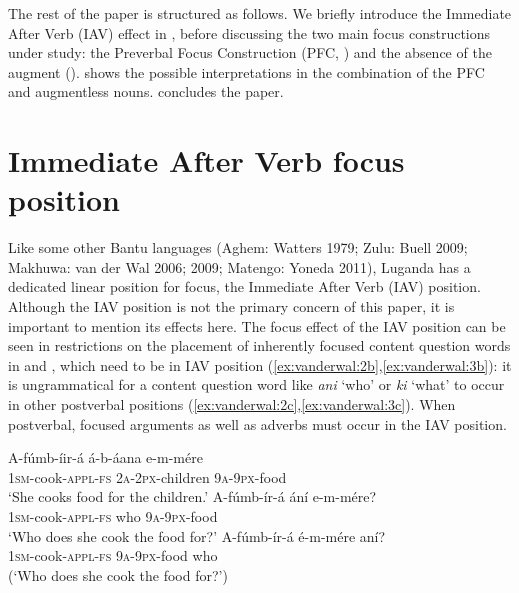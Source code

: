 \documentclass[output=paper]{langsci/langscibook}
\begin{document}
The rest of the paper is structured as follows. We briefly introduce the Immediate After Verb (IAV) effect in , before discussing the two main focus constructions under study: the Preverbal Focus Construction (PFC, ) and the absence of the augment ().  shows the possible interpretations in the combination of the PFC and augmentless nouns.  concludes the paper.

 \section{Immediate After Verb focus position}\label{sec:vanderwal:2}

Like some other Bantu languages (Aghem: Watters 1979; Zulu: Buell 2009; Makhuwa: van der Wal 2006; 2009; Matengo: Yoneda 2011), Luganda has a dedicated linear position for focus, the Immediate After Verb (IAV) position. Although the IAV position is not the primary concern of this paper, it is important to mention its effects here. The focus effect of the IAV position can be seen in restrictions on the placement of inherently focused content question words in  and , which need to be in IAV position (\ref{ex:vanderwal:2b},\ref{ex:vanderwal:3b}): it is ungrammatical for a content question word like \textit{ani} ‘who’ or \textit{ki} ‘what’ to occur in other postverbal positions (\ref{ex:vanderwal:2c},\ref{ex:vanderwal:3c}). When postverbal, focused arguments as well as adverbs must occur in the IAV position.

\ea\label{ex:vanderwal:2}
\ea\label{ex:vanderwal:2a}
\gll   A-fúmb-íir-á    á-b-áana    e-m-mére\\
       \textsc{1sm}-cook-\textsc{appl}-\textsc{fs}  \textsc{2a}-\textsc{2px}-children  \textsc{9a}-\textsc{9px}-food\\
\glt   ‘She cooks food for the children.’
\ex\label{ex:vanderwal:2b}
\gll   A-fúmb-ír-á    ání  e-m-mére?\\
       \textsc{1sm}-cook-\textsc{appl}-\textsc{fs}  who  \textsc{9a}-\textsc{9px}-food\\
\glt   ‘Who does she cook the food for?’
\ex\label{ex:vanderwal:2c}
\gll   *A-fúmb-ír-á  é-m-mére   aní?\\
       \textsc{1sm}-cook-\textsc{appl}-\textsc{fs}  \textsc{9a-9px}-food  who\\
\glt   (‘Who does she cook the food for?’)
\z
\z
\end{document}
